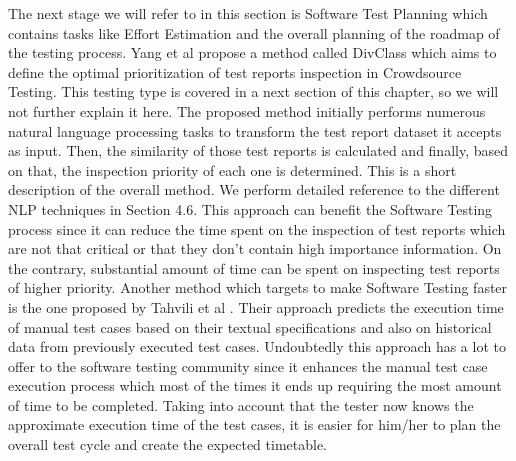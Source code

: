 The next stage we will refer to in this section is Software Test Planning which contains tasks like Effort Estimation and the overall planning of the roadmap of the testing 
process. Yang et al \cite{9617598} propose a method called DivClass which aims to define the optimal prioritization of test reports inspection in Crowdsource Testing. This testing type 
is covered in a next section of this chapter, so we will not further explain it here. The proposed method initially performs numerous natural language processing tasks to transform the 
test report dataset it accepts as input. Then, the similarity of those test reports is calculated and finally, based on that, the inspection priority of each one is determined. This is a 
short description of the overall method. We perform detailed reference to the different NLP techniques in Section 4.6. This approach can benefit the Software Testing process since it can 
reduce the time spent on the inspection of test reports which are not that critical or that they don't contain high importance information. On the contrary, substantial amount of time 
can be spent on inspecting test reports of higher priority. Another method which targets to make Software Testing faster is the one proposed by Tahvili et al \cite{8051381}. Their approach 
predicts the execution time of manual test cases based on their textual specifications and also on historical data from previously executed test cases. Undoubtedly this approach has a lot 
to offer to the software testing community since it enhances the manual test case execution process which most of the times it ends up requiring the most amount of time to be completed. Taking 
into account that the tester now knows the approximate execution time of the test cases, it is easier for him/her to plan the overall test cycle and create the expected timetable. \\

